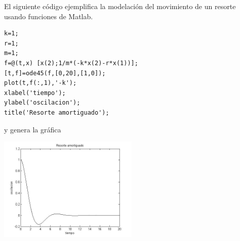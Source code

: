\documentclass[11pt]{article}
\begin{document}
El siguiente c\'odigo ejemplifica la modelaci\'on del movimiento de un resorte usando funciones de Matlab.
\begin{lstlisting}
k=1;
r=1;
m=1;
f=@(t,x) [x(2);1/m*(-k*x(2)-r*x(1))];
[t,f]=ode45(f,[0,20],[1,0]);
plot(t,f(:,1),'-k');
xlabel('tiempo');
ylabel('oscilacion');
title('Resorte amortiguado');
\end{lstlisting}
y genera la gr\'afica
\begin{center}
\includegraphics[width=0.5\textwidth]{eje5.jpg}
\end{center}

\newpage
\end{document}
